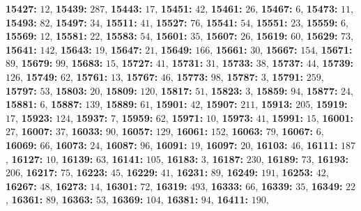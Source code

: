 \textsf{\bfseries 15427:} $12$, \textsf{\bfseries 15439:} $287$, \textsf{\bfseries 15443:} $17$, \textsf{\bfseries 15451:} $42$, \textsf{\bfseries 15461:} $26$, \textsf{\bfseries 15467:} $6$, \textsf{\bfseries 15473:} $11$, \textsf{\bfseries 15493:} $82$, \textsf{\bfseries 15497:} $34$, \textsf{\bfseries 15511:} $41$, \textsf{\bfseries 15527:} $76$, \textsf{\bfseries 15541:} $54$, \textsf{\bfseries 15551:} $23$, \textsf{\bfseries 15559:} $6$, \textsf{\bfseries 15569:} $12$, \textsf{\bfseries 15581:} $22$, \textsf{\bfseries 15583:} $54$, \textsf{\bfseries 15601:} $35$, \textsf{\bfseries 15607:} $26$, \textsf{\bfseries 15619:} $60$, \textsf{\bfseries 15629:} $73$, \textsf{\bfseries 15641:} $142$, \textsf{\bfseries 15643:} $19$, \textsf{\bfseries 15647:} $21$, \textsf{\bfseries 15649:} $166$, \textsf{\bfseries 15661:} $30$, \textsf{\bfseries 15667:} $154$, \textsf{\bfseries 15671:} $89$, \textsf{\bfseries 15679:} $99$, \textsf{\bfseries 15683:} $15$, \textsf{\bfseries 15727:} $41$, \textsf{\bfseries 15731:} $31$, \textsf{\bfseries 15733:} $38$, \textsf{\bfseries 15737:} $44$, \textsf{\bfseries 15739:} $126$, \textsf{\bfseries 15749:} $62$, \textsf{\bfseries 15761:} $13$, \textsf{\bfseries 15767:} $46$, \textsf{\bfseries 15773:} $98$, \textsf{\bfseries 15787:} $3$, \textsf{\bfseries 15791:} $259$, \textsf{\bfseries 15797:} $53$, \textsf{\bfseries 15803:} $20$, \textsf{\bfseries 15809:} $120$, \textsf{\bfseries 15817:} $51$, \textsf{\bfseries 15823:} $3$, \textsf{\bfseries 15859:} $94$, \textsf{\bfseries 15877:} $24$, \textsf{\bfseries 15881:} $6$, \textsf{\bfseries 15887:} $139$, \textsf{\bfseries 15889:} $61$, \textsf{\bfseries 15901:} $42$, \textsf{\bfseries 15907:} $211$, \textsf{\bfseries 15913:} $205$, \textsf{\bfseries 15919:} $17$, \textsf{\bfseries 15923:} $124$, \textsf{\bfseries 15937:} $7$, \textsf{\bfseries 15959:} $62$, \textsf{\bfseries 15971:} $10$, \textsf{\bfseries 15973:} $41$, \textsf{\bfseries 15991:} $15$, \textsf{\bfseries 16001:} $27$, \textsf{\bfseries 16007:} $37$, \textsf{\bfseries 16033:} $90$, \textsf{\bfseries 16057:} $129$, \textsf{\bfseries 16061:} $152$, \textsf{\bfseries 16063:} $79$, \textsf{\bfseries 16067:} $6$, \textsf{\bfseries 16069:} $66$, \textsf{\bfseries 16073:} $24$, \textsf{\bfseries 16087:} $96$, \textsf{\bfseries 16091:} $19$, \textsf{\bfseries 16097:} $20$, \textsf{\bfseries 16103:} $46$, \textsf{\bfseries 16111:} $187$, \textsf{\bfseries 16127:} $10$, \textsf{\bfseries 16139:} $63$, \textsf{\bfseries 16141:} $105$, \textsf{\bfseries 16183:} $3$, \textsf{\bfseries 16187:} $230$, \textsf{\bfseries 16189:} $73$, \textsf{\bfseries 16193:} $206$, \textsf{\bfseries 16217:} $75$, \textsf{\bfseries 16223:} $45$, \textsf{\bfseries 16229:} $41$, \textsf{\bfseries 16231:} $89$, \textsf{\bfseries 16249:} $191$, \textsf{\bfseries 16253:} $42$, \textsf{\bfseries 16267:} $48$, \textsf{\bfseries 16273:} $14$, \textsf{\bfseries 16301:} $72$, \textsf{\bfseries 16319:} $493$, \textsf{\bfseries 16333:} $66$, \textsf{\bfseries 16339:} $35$, \textsf{\bfseries 16349:} $22$, \textsf{\bfseries 16361:} $89$, \textsf{\bfseries 16363:} $53$, \textsf{\bfseries 16369:} $104$, \textsf{\bfseries 16381:} $94$, \textsf{\bfseries 16411:} $190$, 
